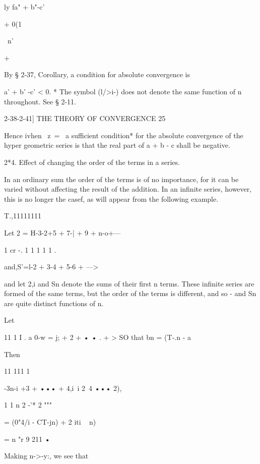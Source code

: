 ly fa" + b"-c'



+ 0(1

\ n'

+



  






By § 2-37, Corollary, a condition for absolute convergence is

a' + b' -c' < 0. * The symbol (l/>i-) does not denote the same
function of n throughout. See § 2-11.



2-38-2-41] THE THEORY OF CONVERGENCE 25

Hence ivhen \ z\ = \, a sufficient condition* for the absolute
convergence of the hyper geometric series is that the real part of a +
b - c shall be negative.

2*4. Effect of changing the order of the terms in a series.

In an ordinary sum the order of the terms is of no importance, for it
can be varied without affecting the result of the addition. In an
infinite series, however, this is no longer the casef, as will appear
from the following example.

T.,11111111

Let 2 = H-3-2+5 + 7-| + 9 + n-o+---

1 cr -. 1 1 1 1 1 .

and,S'=l-2 + 3-4 + 5-6 + --->

and let 2,i and Sn denote the sums of their first n terms. These
infinite series are formed of the same terms, but the order of the
terms is different, and so - and Sn are quite distinct functions of n.



Let


11 1 I . a 0-w = j; + 2 + • • . + > SO that bn = (T-.n - a


Then


 11 111 1

-3n-i +3 + ••• + 4,i\ i 2~4 ••• 2),




1 1 n 2 -'* 2 """




= (0"4/i - CT-jn) + 2 iti ~ n)




= n "r 9 211 •



Making n->-y:, we see that


